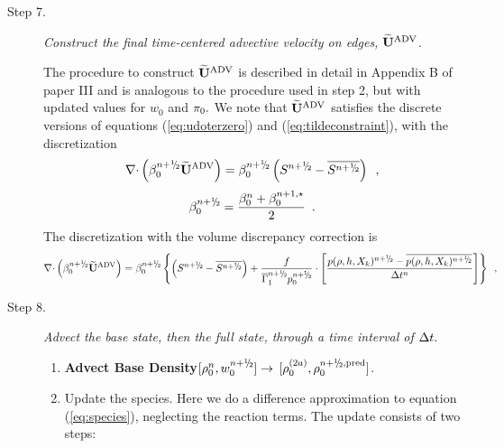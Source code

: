 \begin{description}
\begin{enumerate}
\end{enumerate}

\item[Step 7.] {\em Construct the final time-centered advective velocity on 
edges, $\widetilde{\mathbf{U}}^{\mathrm{ADV}}$.}

The procedure to construct $\widetilde{\mathbf{U}}^{\mathrm{ADV}}$ is described in detail in Appendix B of paper III
and is analogous to the procedure used in step 2, but with updated values
for $w_0$ and $\pi_0.$  We note that $\widetilde{\mathbf{U}}^{\mathrm{ADV}}$ satisfies the discrete versions of 
equations (\ref{eq:udoterzero}) and (\ref{eq:tildeconstraint}), with the discretization
\begin{equation}
\nablab \cdotb \left(\beta_0^{\nph} \uadvtwo\right) =
\beta_0^{\nph}\left(S^{\nph} - \overline{S^{\nph}}\right) \enskip ,
\end{equation}
\begin{equation}
\beta_0^{\nph} = \frac{ \beta_0^n +  \beta_0^{n+1,\star} }{2} \enskip .
\end{equation}
The discretization with the volume discrepancy correction is
\begin{equation}
\nablab \cdotb \left(\beta_0^{\nph} \uadvtwo\right) =
\beta_0^{\nph}\left\{\left(S^{\nph} - \overline{S^{\nph}}\right)
 + \frac{f}{\gammabar^{\nph} p_0^{\nph}}\cdot 
\left[\frac{p(\rho,h,X_k)^{\nph} - \overline{p(\rho,h,X_k)^{\nph}}}{\Delta t^n}\right]\right\} \enskip ,
\end{equation}

\item[Step 8.] {\em Advect the base state, then the full state, through a time interval of $\Delta t.$}

\begin{enumerate}
\renewcommand{\theenumi}{{\bf \alph{enumi}}}

\item {\bf Advect Base Density}$[\rho_0^{n},w_0^{\nph}] \rightarrow$ 
$[\rho_0^{(2a)}, \rho_0^{\nph,{\rm pred}}]$.

\item Update the species.  Here we do a difference approximation to
  equation (\ref{eq:species}), neglecting the reaction terms.  The
  update consists of two steps:


\end{enumerate}
\end{description}
